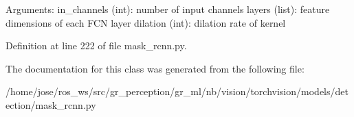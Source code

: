 \begin{DoxyVerb}Arguments:
    in_channels (int): number of input channels
    layers (list): feature dimensions of each FCN layer
    dilation (int): dilation rate of kernel
\end{DoxyVerb}
 

Definition at line 222 of file mask\+\_\+rcnn.\+py.



The documentation for this class was generated from the following file\+:\begin{DoxyCompactItemize}
\item 
/home/jose/ros\+\_\+ws/src/gr\+\_\+perception/gr\+\_\+ml/nb/vision/torchvision/models/detection/mask\+\_\+rcnn.\+py\end{DoxyCompactItemize}
